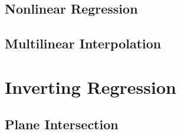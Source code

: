 \subsection{Nonlinear Regression}
   \cite{gallant1975nonlinear}

\subsection{Multilinear Interpolation}
   \cite{davies1997multidimensional}

\section{Inverting Regression}


\subsection{Plane Intersection}
   \cite{patrikalakis1993surface}


